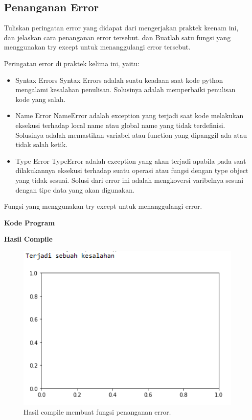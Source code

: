 \subsection{Penanganan Error}
Tuliskan  peringatan  error  yang  didapat  dari  mengerjakan  praktek  keenam  ini, dan  jelaskan  cara  penanganan  error  tersebut. dan  Buatlah  satu  fungsi  yang menggunakan try except untuk menanggulangi error tersebut.

\hfill \break
Peringatan error di praktek kelima ini, yaitu:
\begin{itemize}
	\item Syntax Errors
	Syntax Errors adalah suatu keadaan saat kode python mengalami kesalahan penulisan. Solusinya adalah memperbaiki penulisan kode yang salah.
	
	\item Name Error
	NameError adalah exception yang terjadi saat kode melakukan eksekusi terhadap local name atau global name yang tidak terdefinisi. Solusinya adalah memastikan variabel atau function yang dipanggil ada atau tidak salah ketik.
	
	\item Type Error
	TypeError adalah exception yang akan terjadi apabila pada saat dilakukannya eksekusi terhadap suatu operasi atau fungsi dengan type object yang tidak sesuai. Solusi dari error ini adalah mengkoversi varibelnya sesuai dengan tipe data yang akan digunakan.
\end{itemize}
\hfill \break
Fungsi yang menggunakan try except untuk menanggulangi error.

\hfill \break
\textbf{Kode Program}



\hfill \break
\textbf{Hasil Compile}

\begin{figure}[H]
	\includegraphics[width=12cm]{figures/6/1174017/error.png}
	\centering
	\caption{Hasil compile membuat fungsi penanganan error.}
\end{figure}